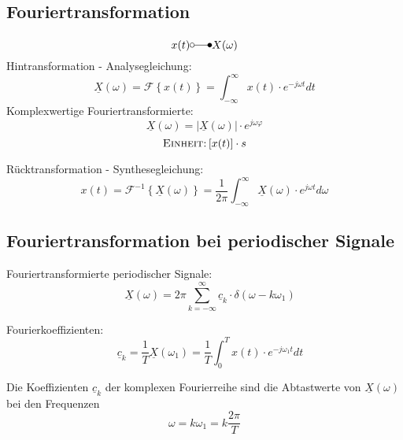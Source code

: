 \subsection{Fouriertransformation}
\begin{mdframed}[style=exercise]
	\[
		x(t) \laplace X(\omega)
	\]
	Hintransformation - Analysegleichung:
	\[
		\underline{X}(\omega)=\mathcal{F}\left\{ x(t) \right\} = \int_{-\infty}^{\infty} x(t) \cdot e^{-j\omega t} dt
	\]
	Komplexwertige Fouriertransformierte:
	\[
		\underline{X}(\omega) = |\underline{X}(\omega)|\cdot e^{j\omega\varphi}
	\]
	\footnotesize
	$$\textsc{Einheit:} \left[ x(t) \right]\cdot s$$

	\normalsize

	Rücktransformation - Synthesegleichung:
	\[
		x(t) = \mathcal{F}^{-1}\left\{ \underline{X}(\omega) \right\} = \frac{1}{2\pi}\int_{-\infty}^{\infty} \underline{X}(\omega) \cdot e^{j\omega t} d\omega
	\]
\end{mdframed}

\subsection{Fouriertransformation bei periodischer Signale}
\begin{mdframed}[style=exercise]

	Fouriertransformierte periodischer Signale:
	\[
		\quad \underline{X}(\omega) =
		2\pi\sum_{k=-\infty}^{\infty} \underline{c}_k\cdot
		\delta(\omega-k\omega_1)
	\]

	Fourierkoeffizienten:
	\[
		\quad \underline{c}_k =
		\frac{1}{T}\underline{X}(\omega_1) =
		\frac{1}{T}\int_0^T x(t) \cdot e^{-j\omega_1 t} dt
	\]

	Die Koeffizienten $\underline{c}_k $ der komplexen Fourierreihe sind die
	Abtastwerte von $\underline{X}(\omega)$ bei den Frequenzen
	\[\omega=k\omega_1=k\frac{2\pi}{T}\]
\end{mdframed}

